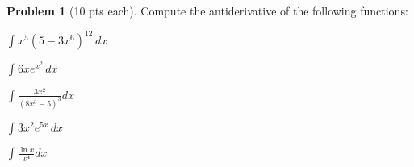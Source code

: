 \documentclass[12pt]{article}
\theoremstyle{definition}
\newtheorem{problem}{Problem}
\begin{document}
\bigskip
\begin{problem}[10 pts each]
Compute the antiderivative of the following functions:
\item $\displaystyle{\int x^5 (5 - 3x^6)^{12}\, dx}$
\vspace{2cm}
\item $\displaystyle{\int  6xe^{x^2} \, dx}$
\vspace{2cm}
\item $\displaystyle{\int \frac{3x^2}{(8x^3-5)^3} dx}$
\vspace{4cm}
\item $\displaystyle{\int 3x^2 e^{5x}\, dx}$
\vspace{4cm}
\item $\displaystyle{\int \frac{\ln x}{x^4} dx}$
\vspace{4cm}
\end{problem}
\end{document}
